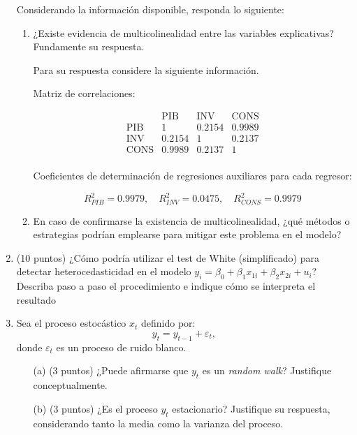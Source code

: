 \documentclass[10pt,a4paper]{article}
\begin{document}
\begin{enumerate}
Considerando la información disponible, responda lo siguiente:

\begin{enumerate}
    \item ¿Existe evidencia de multicolinealidad entre las variables explicativas? Fundamente su respuesta.

Para su respuesta considere la siguiente información.

    Matriz de correlaciones:

    \[
    \begin{array}{c|ccc}
    & \text{PIB} & \text{INV} & \text{CONS} \\
    \hline
    \text{PIB} & 1 & 0.2154 & 0.9989 \\
    \text{INV} & 0.2154 & 1 & 0.2137 \\
    \text{CONS} & 0.9989 & 0.2137 & 1 \\
    \end{array}
    \]

    Coeficientes de determinación de regresiones auxiliares para cada regresor:

    \[
    R_{PIB}^2 = 0.9979, \quad R_{INV}^2 = 0.0475, \quad R_{CONS}^2 = 0.9979
    \]

    \item En caso de confirmarse la existencia de multicolinealidad, ¿qué métodos o estrategias podrían emplearse para mitigar este problema en el modelo?
\end{enumerate}

\item (10 puntos)
¿Cómo podría utilizar el test de White (simplificado) para detectar heterocedasticidad en el modelo \( y_i = \beta_0 + \beta_1 x_{1i} + \beta_2 x_{2i} + u_i \)? Describa paso a paso el procedimiento e indique cómo se interpreta el resultado



\item  Sea el proceso estocástico \( x_t \) definido por:
\[
y_t = y_{t-1} + \varepsilon_t,
\]
donde \( \varepsilon_t \) es un proceso de ruido blanco. 

\begin{enumerate}
    \item[(a)] (3 puntos) ¿Puede afirmarse que \( y_t \) es un \textit{random walk}? Justifique conceptualmente.
    
    \item[(b)]  (3 puntos) ¿Es el proceso \( y_t \) estacionario? Justifique su respuesta, considerando tanto la media como la varianza del proceso.
    

\end{enumerate}
\end{enumerate}
\end{document}

